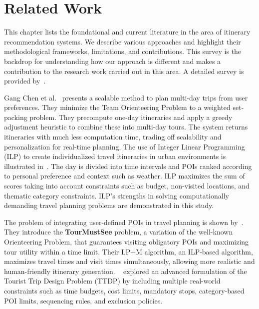 \section{Related Work}

This chapter lists the foundational and current literature in the area of itinerary recommendation systems. We describe various approaches and highlight their methodological frameworks, limitations, and contributions. This survey is the backdrop for understanding how our approach is different and makes a contribution to the research work carried out in this area. A detailed survey is provided by~\cite{gavalas2014survey, sylejmani2011survey}.

Gang Chen et al.~\cite{chen2014automatic} presents a scalable method to plan multi-day trips from user preferences. They minimize the Team Orienteering Problem to a weighted set-packing problem. They precompute one-day itineraries and apply a greedy adjustment heuristic to combine these into multi-day tours. The system returns itineraries with much less computation time, trading off scalability and personalization for real-time planning. The use of Integer Linear Programming (ILP) to create individualized travel itineraries in urban environments is illustrated in~\cite{vanzelst2016itinerary}. The day is divided into time intervals and POIs ranked according to personal preference and context such as weather. ILP maximizes the sum of scores taking into account constraints such as budget, non-visited locations, and thematic category constraints. ILP's strengths in solving computationally demanding travel planning problems are demonstrated in this study.

The problem of integrating user-defined POIs in travel planning is shown by~\cite{taylor2018tour}. They introduce the \textbf{TourMustSee} problem, a variation of the well-known Orienteering Problem, that guarantees visiting obligatory POIs and maximizing tour utility within a time limit. Their LP+M algorithm, an ILP-based algorithm, maximizes travel times and visit times simultaneously, allowing more realistic and human-friendly itinerary generation. ~\cite{vu2022branch} explored an advanced formulation of the Tourist Trip Design Problem (TTDP) by including multiple real-world constraints such as time budgets, cost limits, mandatory stops, category-based POI limits, sequencing rules, and exclusion policies.

